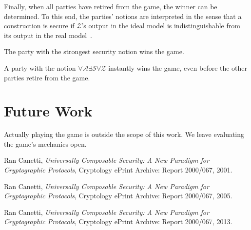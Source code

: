 \documentclass{llncs}
\begin{document}
Finally, when all parties have retired from the game, the winner can be determined. To this end, the parties' notions are interpreted in the sense that a construction is secure if $\mathcal{Z}$'s output in the ideal model is indistinguishable from its output in the real model~\cite{can01,can05,can13}.

\begin{theorem}
	The party with the strongest security notion wins the game.
\end{theorem}

\begin{theorem}
	A party with the notion $\forall\mathcal{A}\exists\mathcal{S}\forall\mathcal{Z}$ instantly wins the game, even before the other parties retire from the game.
\end{theorem}

\section{Future Work}
Actually playing the game is outside the scope of this work.
We leave evaluating the game's mechanics open.

\begin{thebibliography}{9}
  Ran Canetti,
  \emph{Universally Composable Security: A New Paradigm for Cryptographic Protocols},
  Cryptology ePrint Archive: Report 2000/067,
  2001.

  Ran Canetti,
  \emph{Universally Composable Security: A New Paradigm for Cryptographic Protocols},
  Cryptology ePrint Archive: Report 2000/067,
  2005.

  Ran Canetti,
  \emph{Universally Composable Security: A New Paradigm for Cryptographic Protocols},
  Cryptology ePrint Archive: Report 2000/067,
  2013.
\end{thebibliography}
\end{document}
